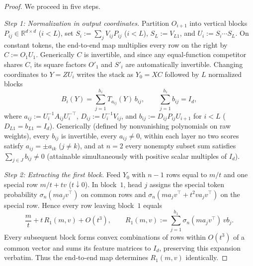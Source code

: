 \documentclass[11pt]{article}
\theoremstyle{plain}
\theoremstyle{definition}
\theoremstyle{remark}
\begin{document}
\begin{proof}
We proceed in five steps.

\emph{Step 1: Normalization in output coordinates.}
Partition $O_{i+1}$ into vertical blocks $P_{ij} \in \mathbb{R}^{d \times d}$ ($i < L$), set $S_i := \sum_j V_{ij} P_{ij}$ ($i < L$), $S_L := V_{L1}$, and $U_i := S_i \cdots S_L$. On constant tokens, the end-to-end map multiplies every row on the right by $C := O_1 U_1$. Generically $C$ is invertible, and since any equal-function competitor shares $C$, its square factors $O'_1$ and $S'_i$ are automatically invertible. Changing coordinates to $Y = Z U_i$ writes the stack as $Y_0 = X C$ followed by $L$ normalized blocks
\[
B_i(Y) = \sum_{j=1}^{h_i} T_{a_{ij}}(Y)\, b_{ij}, \qquad \sum_{j=1}^{h_i} b_{ij} = I_d,
\]
where $a_{ij} := U_i^{-1} A_{ij} U_i^{-\top}$, $D_{ij} := U_i^{-1} V_{ij}$, and $b_{ij} := D_{ij} P_{ij} U_{i+1}$ for $i < L$ ($D_{L1} = b_{L1} = I_d$). Generically (defined by nonvanishing polynomials on raw weights), every $b_{ij}$ is invertible, every $a_{ij} \neq 0$, within each layer no two scores satisfy $a_{ij} = \pm a_{ik}$ ($j \neq k$), and at $n = 2$ every nonempty subset sum satisfies $\sum_{j \in J} b_{ij} \neq 0$ (attainable simultaneously with positive scalar multiples of $I_d$).

\emph{Step 2: Extracting the first block.}
Feed $Y_0$ with $n - 1$ rows equal to $m/t$ and one special row $m/t + t v$ ($t \downarrow 0$). In block~$1$, head $j$ assigns the special token probability $\sigma_n(m a_j v^\top)$ on common rows and $\sigma_n(m a_j v^\top + t^2 v a_j v^\top)$ on the special row. Hence every row leaving block~$1$ equals
\[
\frac{m}{t} + t\, R_1(m, v) + O(t^3), \qquad
R_1(m, v) := \sum_{j=1}^{h_1} \sigma_n(m a_j v^\top)\, v b_j.
\]
Every subsequent block forms convex combinations of rows within $O(t^3)$ of a common vector and sums its feature matrices to $I_d$, preserving this expansion verbatim. Thus the end-to-end map determines $R_1(m, v)$ identically.


\end{proof}
\end{document}
